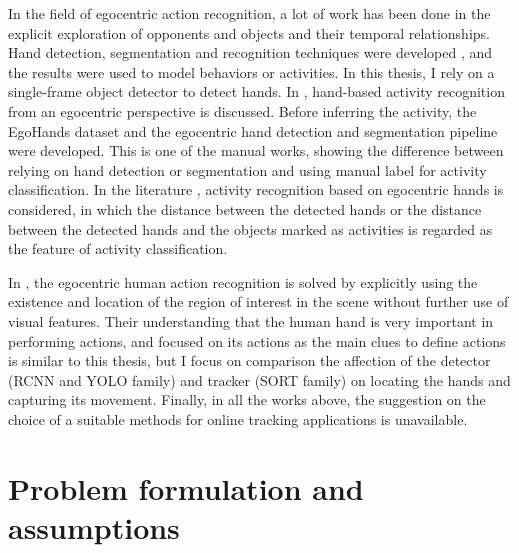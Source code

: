 In the field of egocentric action recognition, a lot of work has been done in the explicit exploration of opponents and objects and their temporal relationships. Hand detection, segmentation and recognition techniques were developed \cite{6619302} \cite{6910041} \cite{10.1016/j.cviu.2016.09.005}, and the results were used to model behaviors or activities. In this thesis, I rely on a single-frame object detector to detect hands. In \cite{7410583}, hand-based activity recognition from an egocentric perspective is discussed. Before inferring the activity, the EgoHands dataset and the egocentric hand detection and segmentation pipeline were developed. This is one of the manual works, showing the difference between relying on hand detection or segmentation and using manual label for activity classification. In the literature \cite{Recognition}, activity recognition based on egocentric hands is considered, in which the distance between the detected hands or the distance between the detected hands and the objects marked as activities is regarded as the feature of activity classification.

In \cite{9060114}, the egocentric human action recognition is solved by explicitly using the existence and location of the region of interest in the scene without further use of visual features. Their understanding that the human hand is very important in performing actions, and focused on its actions as the main clues to define actions is similar to this thesis, but I focus on comparison the affection of the detector (RCNN and YOLO family) and tracker (SORT family) on locating the hands and capturing its movement. Finally, in all the works above, the suggestion on the choice of a suitable methods for online tracking applications is unavailable.
\section{Problem formulation and assumptions}